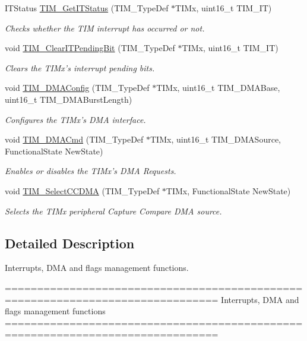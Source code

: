 \begin{DoxyCompactItemize}
I\-T\-Status \hyperlink{group___t_i_m___group5_ga0827a0b411707304f76d33050727c24d}{T\-I\-M\-\_\-\-Get\-I\-T\-Status} (T\-I\-M\-\_\-\-Type\-Def $\ast$T\-I\-Mx, uint16\-\_\-t T\-I\-M\-\_\-\-I\-T)
\begin{DoxyCompactList}\small\item\em Checks whether the T\-I\-M interrupt has occurred or not. \end{DoxyCompactList}\item 
void \hyperlink{group___t_i_m___group5_ga9eb1e95af71ed380f51a2c6d585cc5d6}{T\-I\-M\-\_\-\-Clear\-I\-T\-Pending\-Bit} (T\-I\-M\-\_\-\-Type\-Def $\ast$T\-I\-Mx, uint16\-\_\-t T\-I\-M\-\_\-\-I\-T)
\begin{DoxyCompactList}\small\item\em Clears the T\-I\-Mx's interrupt pending bits. \end{DoxyCompactList}\item 
void \hyperlink{group___t_i_m___group5_gad7156f84c436c8ac92cd789611826d09}{T\-I\-M\-\_\-\-D\-M\-A\-Config} (T\-I\-M\-\_\-\-Type\-Def $\ast$T\-I\-Mx, uint16\-\_\-t T\-I\-M\-\_\-\-D\-M\-A\-Base, uint16\-\_\-t T\-I\-M\-\_\-\-D\-M\-A\-Burst\-Length)
\begin{DoxyCompactList}\small\item\em Configures the T\-I\-Mx's D\-M\-A interface. \end{DoxyCompactList}\item 
void \hyperlink{group___t_i_m___group5_ga24700389cfa3ea9b42234933b23f1399}{T\-I\-M\-\_\-\-D\-M\-A\-Cmd} (T\-I\-M\-\_\-\-Type\-Def $\ast$T\-I\-Mx, uint16\-\_\-t T\-I\-M\-\_\-\-D\-M\-A\-Source, Functional\-State New\-State)
\begin{DoxyCompactList}\small\item\em Enables or disables the T\-I\-Mx's D\-M\-A Requests. \end{DoxyCompactList}\item 
void \hyperlink{group___t_i_m___group5_ga5273cb65acb885fe7982827b1c6b7d75}{T\-I\-M\-\_\-\-Select\-C\-C\-D\-M\-A} (T\-I\-M\-\_\-\-Type\-Def $\ast$T\-I\-Mx, Functional\-State New\-State)
\begin{DoxyCompactList}\small\item\em Selects the T\-I\-Mx peripheral Capture Compare D\-M\-A source. \end{DoxyCompactList}\end{DoxyCompactItemize}


\subsection{Detailed Description}
Interrupts, D\-M\-A and flags management functions. \begin{DoxyVerb} ===============================================================================
                 Interrupts, DMA and flags management functions
 ===============================================================================  \end{DoxyVerb}
 

